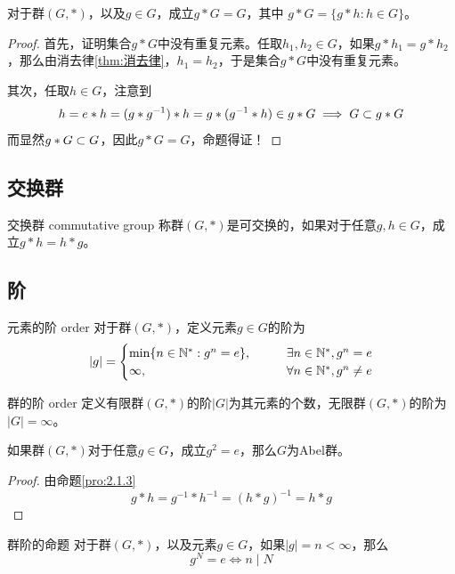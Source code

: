 \begin{proposition}
	对于群$(G,*)$，以及$g\in G$，成立$g*G=G$，其中
	$g*G=\{ g*h:h\in G \}$。
\end{proposition}

\begin{proof}
	首先，证明集合$g*G$中没有重复元素。任取$h_1,h_2\in G$，如果$g*h_1=g*h_2$，那么由消去律\ref{thm:消去律}，$h_1=h_2$，于是集合$g*G$中没有重复元素。
	
	其次，任取$h\in G$，注意到
	$$
	h=e*h=(g*g^{-1})*h=g*(g^{-1}*h)\in g*G\implies G\subset g*G
	$$
	而显然$g*G\subset G$，因此$g*G=G$，命题得证！
\end{proof}

\subsection{交换群}

\begin{definition}{交换群 commutative group}
	称群$(G,*)$是可交换的，如果对于任意$g,h\in G$，成立$g*h=h*g$。
\end{definition}

\subsection{阶}

\begin{definition}{元素的阶 order}
	对于群$(G,*)$，定义元素$g\in G$的阶为
	$$
	|g|=\begin{cases}
		\min\{ n\in\mathbb{N}^*:g^n=e \},\qquad & \exists n\in\mathbb{N}^*, g^n=e\\
		\infty,\qquad & \forall n\in\mathbb{N}^*,g^n\ne e
	\end{cases}
	$$
\end{definition}

\begin{definition}{群的阶 order}
	定义有限群$(G,*)$的阶$|G|$为其元素的个数，无限群$(G,*)$的阶为$|G|=\infty$。
\end{definition}

\begin{proposition}
	如果群$(G,*)$对于任意$g\in G$，成立$g^2=e$，那么$G$为Abel群。
\end{proposition}

\begin{proof}
	由命题\ref{pro:2.1.3}
	$$
	g*h=g^{-1}*h^{-1}=(h*g)^{-1}=h*g
	$$
\end{proof}

\begin{proposition}{}{群阶的命题}
	对于群$(G,*)$，以及元素$g\in G$，如果$|g|=n<\infty$，那么
	$$
	g^N=e\iff n\mid N
	$$
\end{proposition}

